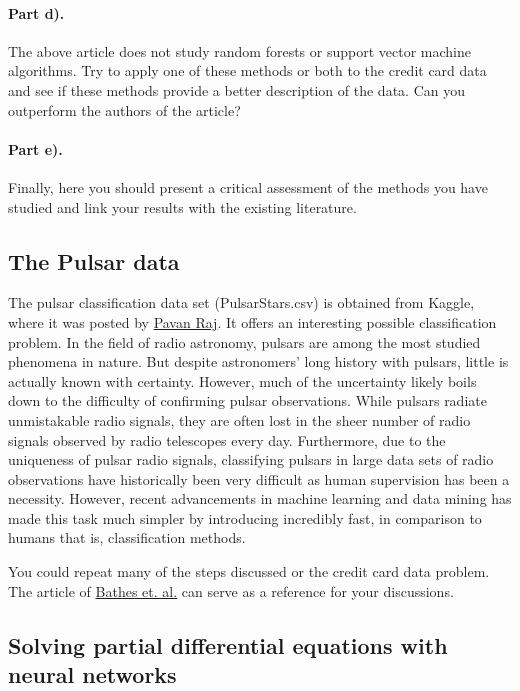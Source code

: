 \documentclass[%
oneside,                 %
final,                   %
10pt]{article}
\begin{document}
\paragraph{Part d).}
The above article does not study random forests or support vector machine algorithms. Try to apply one of these methods or both to the credit card data and see if these methods provide a better description of the data. Can you outperform the authors of the article? 

\paragraph{Part e).}
Finally, here you should present a critical assessment of the methods you have studied and link your results with the existing literature. 



\subsection*{The Pulsar data}

The pulsar classification data set (PulsarStars.csv) is obtained from
Kaggle, where it was posted by \href{{https://www.kaggle.com/pavanraj159/predicting-pulsar-star-in-the-universe/notebook?scriptVersionId=4487650}}{Pavan
Raj}. It
offers an interesting possible classification problem. In the field of
radio astronomy, pulsars are among the most studied phenomena in
nature. But despite astronomers' long history with pulsars, little is
actually known with certainty. However, much of the uncertainty likely
boils down to the difficulty of confirming pulsar observations. While
pulsars radiate unmistakable radio signals, they are often lost in the
sheer number of radio signals observed by radio telescopes every
day. Furthermore, due to the uniqueness of pulsar radio signals,
classifying pulsars in large data sets of radio observations have
historically been very difficult as human supervision has been a
necessity. However, recent advancements in machine learning and data
mining has made this task much simpler by introducing incredibly fast,
in comparison to humans that is, classification methods.

You could repeat many of the steps discussed or the credit card data problem.
The article of \href{{https://arxiv.org/abs/1209.0793}}{Bathes et. al.} can serve as a reference for your discussions. 



\subsection*{Solving partial differential equations with neural networks}
\end{document}
